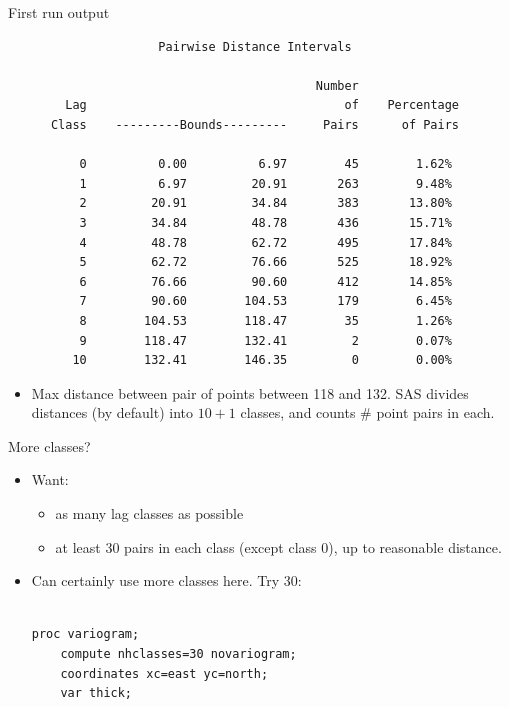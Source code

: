 \begin{frame}[fragile]{First run output}

{\scriptsize
\begin{verbatim}
                     Pairwise Distance Intervals

                                           Number
        Lag                                    of    Percentage
      Class    ---------Bounds---------     Pairs      of Pairs

          0          0.00          6.97        45        1.62%
          1          6.97         20.91       263        9.48%
          2         20.91         34.84       383       13.80%
          3         34.84         48.78       436       15.71%
          4         48.78         62.72       495       17.84%
          5         62.72         76.66       525       18.92%
          6         76.66         90.60       412       14.85%
          7         90.60        104.53       179        6.45%
          8        104.53        118.47        35        1.26%
          9        118.47        132.41         2        0.07%
         10        132.41        146.35         0        0.00%

\end{verbatim}
}

\begin{itemize}
\item Max distance between pair of points between 118 and 132. SAS
  divides distances (by default) into $10+1$ classes, and counts \# point
  pairs in each.
\end{itemize}
\end{frame}

\begin{frame}[fragile]{More classes?}
\begin{itemize}
\item Want:
  \begin{itemize}
  \item as many lag classes as possible
  \item at least 30 pairs in each class (except class 0), up to
    reasonable distance.
  \end{itemize}
\item Can certainly use more classes here. Try 30:

\begin{verbatim}

proc variogram;
    compute nhclasses=30 novariogram;
    coordinates xc=east yc=north;
    var thick;
\end{verbatim}

\end{itemize}
  
\end{frame}

